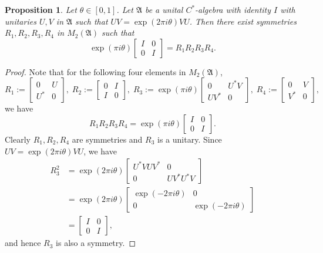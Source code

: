 \documentclass[12pt, preprint]{amsart}
\newtheorem{prop}[thm]{Proposition}
\newcommand{\fA}{\mathfrak A}     \newcommand{\sA}{\mathcal A}
\theoremstyle{definition}
\theoremstyle{remark}
\numberwithin{equation}{section}
\theoremstyle{ser}
\theoremstyle{serr}
\theoremstyle{ser}
\begin{document}
\begin{prop}
\label{prop:univ_Cstar_symprod}
\textsl{
Let $\theta \in [0, 1]$. Let $\mathfrak{A}$ be a unital $C^*$-algebra with identity $I$ with unitaries $U, V$ in $\fA$ such that $UV = \exp(2 \pi i \theta) VU$. Then there exist symmetries $R_1, R_2, R_3, R_4$ in $M_2(\mathfrak{A})$ such that $$\exp(\pi i \theta) \begin{bmatrix}
I & 0 \\
0 & I
\end{bmatrix} = R_1 R_2 R_3 R_4.$$
}
\end{prop}
\begin{proof}
Note that for the following four elements in $M_2(\fA)$,
$$R_1 := \begin{bmatrix}
0 & U\\
U^* & 0
\end{bmatrix},\; R_2 := \begin{bmatrix}
0 & I\\
I & 0
\end{bmatrix},\; R_3 := \exp(\pi i \theta) \begin{bmatrix}
0 & U^* V \\
UV^* & 0
\end{bmatrix},\; R_4 := \begin{bmatrix}
0 & V\\
V^* & 0
\end{bmatrix},$$ we have $$R_1 R_2 R_3 R_4 = \exp(\pi i \theta)
\begin{bmatrix}
I & 0\\
0 & I
\end{bmatrix}.$$ Clearly $R_1, R_2, R_4$ are symmetries and $R_3$ is a unitary. Since $UV = \exp(2 \pi i \theta) VU$, we have
 \begin{align*}
     R_3 ^2 &= \exp(2 \pi i \theta) \begin{bmatrix}
     U^*VUV^* & 0\\
     0 & UV^*U^*V
     \end{bmatrix}\\
     &= \exp(2 \pi i \theta) 
    \begin{bmatrix}
    \exp(-2 \pi i \theta) & 0\\
    0 & \exp(-2 \pi i \theta)
    \end{bmatrix}\\
    & = \begin{bmatrix}
    I & 0\\
    0 & I
    \end{bmatrix},
\end{align*}
and hence $R_3$ is also a symmetry.
\end{proof}
\end{document}
